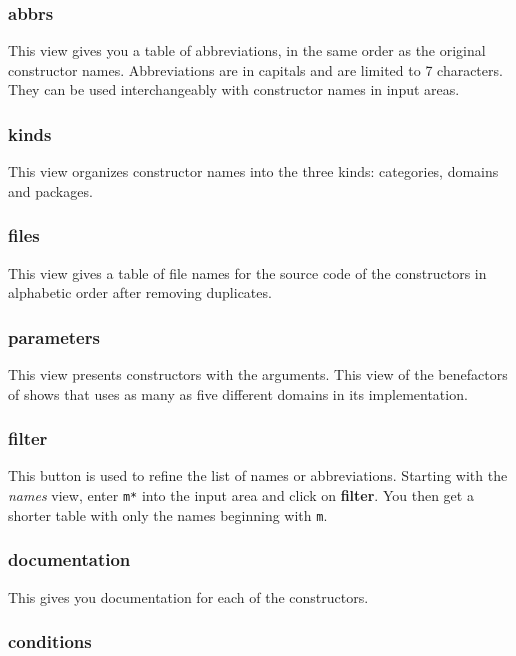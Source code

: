 \subsubsection{abbrs}

This view gives you a table of abbreviations, in the same order as the
original constructor names.
Abbreviations are in capitals and are limited to 7 characters.
They can be used interchangeably with constructor names in input areas.

\subsubsection{kinds}

This view organizes constructor names into
the three kinds: categories, domains and packages.

\subsubsection{files}

This view gives a table of file names for the source
code of the constructors in alphabetic order after removing
duplicates.

\subsubsection{parameters}

This view presents constructors with the arguments.
This view of the benefactors of  shows that
 uses as many as five different  domains
in its implementation.

\subsubsection{filter}

This button is used to refine the list of names or abbreviations.
Starting with the {\it names} view, enter {\tt m*} into the input area
and click on {\bf filter}.
You then get a shorter table with only the names beginning with {\tt m}.

\subsubsection{documentation}

This gives you documentation for each of the constructors.

\subsubsection{conditions}

